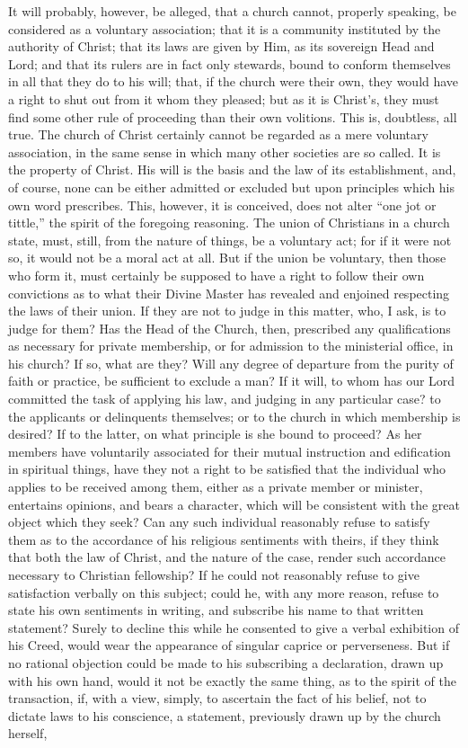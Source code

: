 \documentclass[
]{book}
\begin{document}
It will probably, however, be alleged, that a church cannot, properly speaking, be considered as a voluntary association; that it is a community instituted by the authority of Christ; that its laws are given by Him, as its sovereign Head and Lord; and that its rulers are in fact only stewards, bound to conform themselves in all that they do to his will; that, if the church were their own, they would have a right to shut out from it whom they pleased; but as it is Christ's, they must find some other rule of proceeding than their own volitions. This is, doubtless, all true. The church of Christ certainly cannot be regarded as a mere voluntary association, in the same sense in which many other societies are so called. It is the property of Christ. His will is the basis and the law of its establishment, and, of course, none can be either admitted or excluded but upon principles which his own word prescribes. This, however, it is conceived, does not alter ``one jot or tittle,'' the spirit of the foregoing reasoning. The union of Christians in a church state, must, still, from the nature of things, be a voluntary act; for if it were not so, it would not be a moral act at all. But if the union be voluntary, then those who form it, must certainly be supposed to have a right to follow their own convictions as to what their Divine Master has revealed and enjoined respecting the laws of their union. If they are not to judge in this matter, who, I ask, is to judge for them? Has the Head of the Church, then, prescribed any qualifications as necessary for private membership, or for admission to the ministerial office, in his church? If so, what are they? Will any degree of departure from the purity of faith or practice, be sufficient to exclude a man? If it will, to whom has our Lord committed the task of applying his law, and judging in any particular case? to the applicants or delinquents themselves; or to the church in which membership is desired? If to the latter, on what principle is she bound to proceed? As her members have voluntarily associated for their mutual instruction and edification in spiritual things, have they not a right to be satisfied that the individual who applies to be received among them, either as a private member or minister, entertains opinions, and bears a character, which will be consistent with the great object which they seek? Can any such individual reasonably refuse to satisfy them as to the accordance of his religious sentiments with theirs, if they think that both the law of Christ, and the nature of the case, render such accordance necessary to Christian fellowship? If he could not reasonably refuse to give satisfaction verbally on this subject; could he, with any more reason, refuse to state his own sentiments in writing, and subscribe his name to that written statement? Surely to decline this while he consented to give a verbal exhibition of his Creed, would wear the appearance of singular caprice or perverseness. But if no rational objection could be made to his subscribing a declaration, drawn up with his own hand, would it not be exactly the same thing, as to the spirit of the transaction, if, with a view, simply, to ascertain the fact of his belief, not to dictate laws to his conscience, a statement, previously drawn up by the church herself, 
\end{document}

